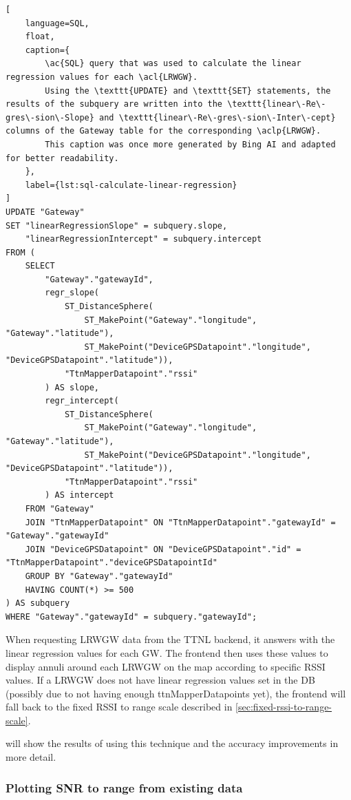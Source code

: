 \begin{lstlisting}[
    language=SQL,
    float,
    caption={
        \ac{SQL} query that was used to calculate the linear regression values for each \acl{LRWGW}.
        Using the \texttt{UPDATE} and \texttt{SET} statements, the results of the subquery are written into the \texttt{linear\-Re\-gres\-sion\-Slope} and \texttt{linear\-Re\-gres\-sion\-Inter\-cept} columns of the Gateway table for the corresponding \aclp{LRWGW}.
        This caption was once more generated by Bing AI and adapted for better readability.
    },
    label={lst:sql-calculate-linear-regression}
]
UPDATE "Gateway"
SET "linearRegressionSlope" = subquery.slope,
    "linearRegressionIntercept" = subquery.intercept
FROM (
    SELECT
        "Gateway"."gatewayId",
        regr_slope(
            ST_DistanceSphere(
                ST_MakePoint("Gateway"."longitude", "Gateway"."latitude"),
                ST_MakePoint("DeviceGPSDatapoint"."longitude", "DeviceGPSDatapoint"."latitude")),
            "TtnMapperDatapoint"."rssi"
        ) AS slope,
        regr_intercept(
            ST_DistanceSphere(
                ST_MakePoint("Gateway"."longitude", "Gateway"."latitude"),
                ST_MakePoint("DeviceGPSDatapoint"."longitude", "DeviceGPSDatapoint"."latitude")),
            "TtnMapperDatapoint"."rssi"
        ) AS intercept
    FROM "Gateway"
    JOIN "TtnMapperDatapoint" ON "TtnMapperDatapoint"."gatewayId" = "Gateway"."gatewayId"
    JOIN "DeviceGPSDatapoint" ON "DeviceGPSDatapoint"."id" = "TtnMapperDatapoint"."deviceGPSDatapointId"
    GROUP BY "Gateway"."gatewayId"
    HAVING COUNT(*) >= 500
) AS subquery
WHERE "Gateway"."gatewayId" = subquery."gatewayId";
\end{lstlisting}

When requesting \acl{LRWGW} data from the \ac{TTNL} backend, it answers with the linear regression values for each \acl{GW}.
The frontend then uses these values to display annuli around each \acl{LRWGW} on the map according to specific \ac{RSSI} values.
If a \acl{LRWGW} does not have linear regression values set in the \ac{DB} (possibly due to not having enough ttnMapperDatapoints yet), the frontend will fall back to the fixed \ac{RSSI} to range scale described in \cref{sec:fixed-rssi-to-range-scale}.

 will show the results of using this technique and the accuracy improvements in more detail.

\subsubsection{Plotting \acs{SNR} to range from existing data}\label{sec:plotting-snr-to-range-from-existing-data}

